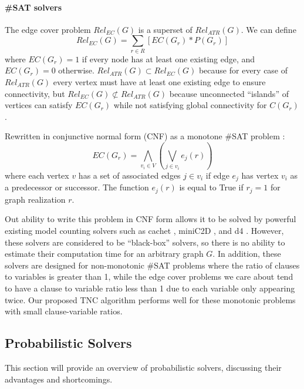 \documentclass[12pt,twocolumn]{article}
\begin{document}
\hypertarget{sat-solvers}{%
\paragraph{\texorpdfstring{\#SAT solvers\\
}{\#SAT solvers }}\label{sat-solvers}}

The edge cover problem \(Rel_{EC}(G)\) is a superset of \(Rel_{ATR}(G)\). We can define \[Rel_{EC}(G) = \sum_{r \in R} [EC(G_r)*P(G_r)]\] where \(EC(G_r)=1\) if every node has at least one existing edge, and \(EC(G_r)=0\) otherwise. \(Rel_{ATR}(G) \subset Rel_{EC}(G)\) because for every case of \(Rel_{ATR}(G)\) every vertex must have at least one existing edge to ensure connectivity, but \(Rel_{EC}(G) \not\subset Rel_{ATR}(G)\) because unconnected ``islands'' of vertices can satisfy \(EC(G_r)\) while not satisfying global connectivity for \(C(G_r)\).

Rewritten in conjunctive normal form (CNF) as a monotone \#SAT problem \cite{roth1996hardness} \cite{vaisman2015model}: \[EC(G_r) = \bigwedge_{v_i \in V} (\bigvee_{j \in v_i} e_j(r))\] where each vertex \(v\) has a set of associated edges \(j \in v_i\) if edge \(e_j\) has vertex \(v_i\) as a predecessor or successor. The function \(e_j(r)\) is equal to True if \(r_j=1\) for graph realization \(r\).

Out ability to write this problem in CNF form allows it to be solved by powerful existing model counting solvers such as cachet \cite{sang2005heuristics}, miniC2D \cite{oztok2015top}, and d4 \cite{lagniez2017improved}. However, these solvers are considered to be ``black-box'' solvers, so there is no ability to estimate their computation time for an arbitrary graph \(G\). In addition, these solvers are designed for non-monotonic \#SAT problems where the ratio of clauses to variables is greater than 1, while the edge cover problems we care about tend to have a clause to variable ratio less than 1 due to each variable only appearing twice. Our proposed TNC algorithm performs well for these monotonic problems with small clause-variable ratios.

\hypertarget{probabilistic-solvers}{%
\subsection{Probabilistic Solvers}\label{probabilistic-solvers}}

This section will provide an overview of probabilistic solvers, discussing their advantages and shortcomings.
\end{document}
